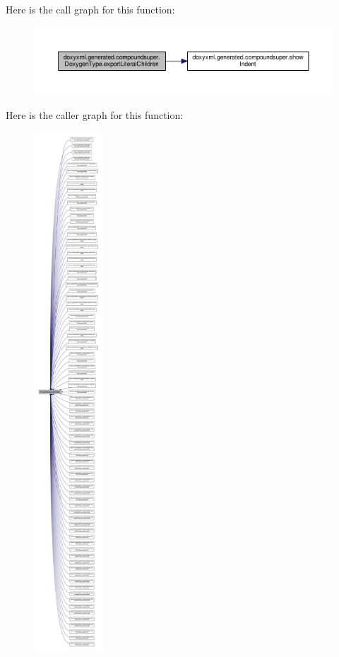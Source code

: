 Here is the call graph for this function\+:
\nopagebreak
\begin{figure}[H]
\begin{center}
\leavevmode
\includegraphics[width=350pt]{d0/d54/classdoxyxml_1_1generated_1_1compoundsuper_1_1DoxygenType_a6a5701224394fc77a1eef84a9cdcb0e4_cgraph}
\end{center}
\end{figure}




Here is the caller graph for this function\+:
\nopagebreak
\begin{figure}[H]
\begin{center}
\leavevmode
\includegraphics[height=550pt]{d0/d54/classdoxyxml_1_1generated_1_1compoundsuper_1_1DoxygenType_a6a5701224394fc77a1eef84a9cdcb0e4_icgraph}
\end{center}
\end{figure}


